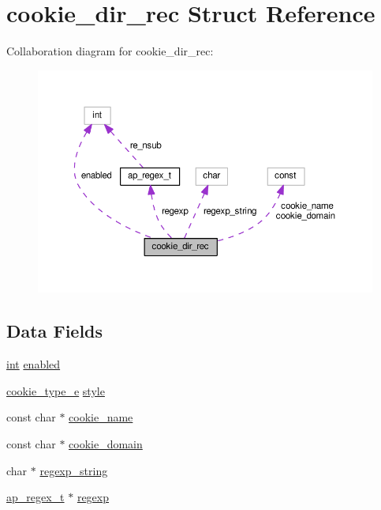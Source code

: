 \hypertarget{structcookie__dir__rec}{}\section{cookie\+\_\+dir\+\_\+rec Struct Reference}
\label{structcookie__dir__rec}


Collaboration diagram for cookie\+\_\+dir\+\_\+rec\+:
\nopagebreak
\begin{figure}[H]
\begin{center}
\leavevmode
\includegraphics[width=350pt]{structcookie__dir__rec__coll__graph}
\end{center}
\end{figure}
\subsection*{Data Fields}
\begin{DoxyCompactItemize}
\item 
\hyperlink{pcre_8txt_a42dfa4ff673c82d8efe7144098fbc198}{int} \hyperlink{structcookie__dir__rec_aa0610931130c8e5849cba9b747f92986}{enabled}
\item 
\hyperlink{mod__usertrack_8c_a575f5a0003fe6499ef133e2f3e5102e3}{cookie\+\_\+type\+\_\+e} \hyperlink{structcookie__dir__rec_a6c13489550478f02208c0b657bc6a458}{style}
\item 
const char $\ast$ \hyperlink{structcookie__dir__rec_a1f8f7357fe396163ae8f9f0fa94bc5b2}{cookie\+\_\+name}
\item 
const char $\ast$ \hyperlink{structcookie__dir__rec_a34838bb74774933797a21b85bd6e6fca}{cookie\+\_\+domain}
\item 
char $\ast$ \hyperlink{structcookie__dir__rec_aba2cb9d555345c4ca07b4b9f291699d0}{regexp\+\_\+string}
\item 
\hyperlink{structap__regex__t}{ap\+\_\+regex\+\_\+t} $\ast$ \hyperlink{structcookie__dir__rec_ac9660caa58ff85face826b2eebed6d34}{regexp}
\end{DoxyCompactItemize}



